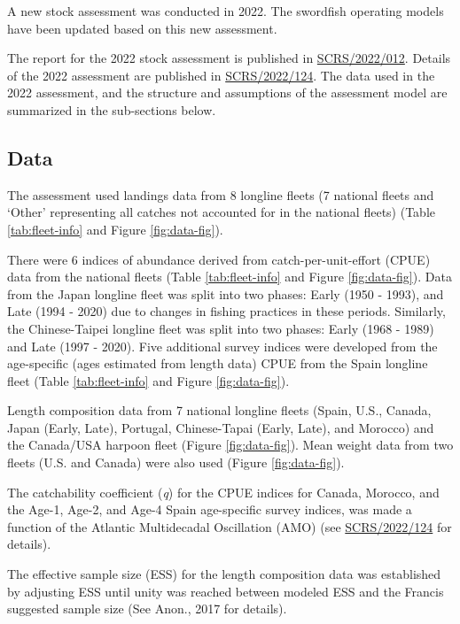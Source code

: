 \documentclass[
]{article}
\begin{document}
A new stock assessment was conducted in 2022. The swordfish operating models have been updated based on this new assessment.

The report for the 2022 stock assessment is published in \href{https://www.iccat.int/Documents/CVSP/CV079_2022/n_2/CV079020392.pdf}{SCRS/2022/012}. Details of the 2022 assessment are published in \href{../SCRS_Papers/Schirripa_SCRS_2022_124.pdf}{SCRS/2022/124}. The data used in the 2022 assessment, and the structure and assumptions of the assessment model are summarized in the sub-sections below.

\hypertarget{data}{%
\subsection{Data}\label{data}}

The assessment used landings data from 8 longline fleets (7 national fleets and `Other' representing all catches not accounted for in the national fleets) (Table \ref{tab:fleet-info} and Figure \ref{fig:data-fig}).

There were 6 indices of abundance derived from catch-per-unit-effort (CPUE) data from the national fleets (Table \ref{tab:fleet-info} and Figure \ref{fig:data-fig}). Data from the Japan longline fleet was split into two phases: Early (1950 - 1993), and Late (1994 - 2020) due to changes in fishing practices in these periods. Similarly, the Chinese-Taipei longline fleet was split into two phases: Early (1968 - 1989) and Late (1997 - 2020). Five additional survey indices were developed from the age-specific (ages estimated from length data) CPUE from the Spain longline fleet (Table \ref{tab:fleet-info} and Figure \ref{fig:data-fig}).

Length composition data from 7 national longline fleets (Spain, U.S., Canada, Japan (Early, Late), Portugal, Chinese-Tapai (Early, Late), and Morocco) and the Canada/USA harpoon fleet (Figure \ref{fig:data-fig}). Mean weight data from two fleets (U.S. and Canada) were also used (Figure \ref{fig:data-fig}).

The catchability coefficient (\emph{q}) for the CPUE indices for Canada, Morocco, and the Age-1, Age-2, and Age-4 Spain age-specific survey indices, was made a function of the Atlantic Multidecadal Oscillation (AMO) (see \href{../SCRS_Papers/Schirripa_SCRS_2022_124.pdf}{SCRS/2022/124} for details).

The effective sample size (ESS) for the length composition data was established by adjusting ESS until unity was reached between modeled ESS and the Francis suggested sample size (See Anon., 2017 for details).
\end{document}
